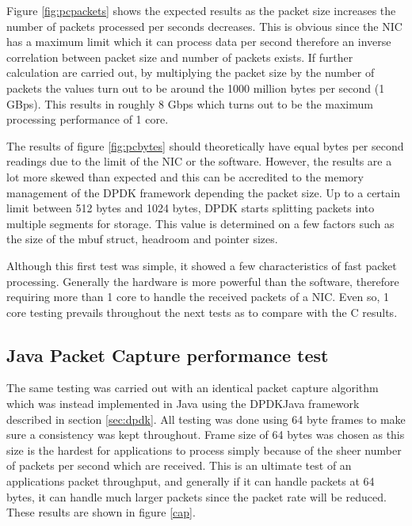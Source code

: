 \documentclass[final_report.tex]{subfiles}
\begin{document}
Figure \ref{fig:pcpackets} shows the expected results as the packet size increases the number of packets processed per seconds decreases. This is obvious since the NIC has a maximum limit which it can process data per second therefore an inverse correlation between packet size and number of packets exists. If further calculation are carried out, by multiplying the packet size by the number of packets the values turn out to be around the 1000 million bytes per second (1 GBps). This results in roughly 8 Gbps which turns out to be the maximum processing performance of 1 core.

The results of figure \ref{fig:pcbytes} should theoretically have equal bytes per second readings due to the limit of the NIC or the software. However, the results are a lot more skewed than expected and this can be accredited to the memory management of the DPDK framework depending the packet size. Up to a certain limit between 512 bytes and 1024 bytes, DPDK starts splitting packets into multiple segments for storage. This value is determined on a few factors such as the size of the mbuf struct, headroom and pointer sizes.

Although this first test was simple, it showed a few characteristics of fast packet processing. Generally the hardware is more powerful than the software, therefore requiring more than 1 core to handle the received packets of a NIC. Even so, 1 core testing prevails throughout the next tests as to compare with the C results.

\subsection{Java Packet Capture performance test}
The same testing was carried out with an identical packet capture algorithm which was instead implemented in Java using the DPDKJava framework described in section \ref{sec:dpdk}. All testing was done using 64 byte frames to make sure a consistency was kept throughout. Frame size of 64 bytes was chosen as this size is the hardest for applications to process simply because of the sheer number of packets per second which are received. This is an ultimate test of an applications packet throughput, and generally if it can handle packets at 64 bytes, it can handle much larger packets since the packet rate will be reduced. These results are shown in figure \ref{cap}.
\end{document}
